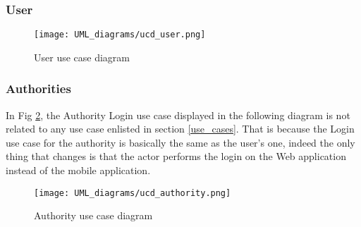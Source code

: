 \subsubsection{User}
\begin{figure}[H]
  \centering
  \texttt{[image: UML\_diagrams/ucd\_user.png]}
  \caption{User use case diagram}
  \label{fig:user_ucd}
\end{figure}

\subsubsection{Authorities}
In Fig \ref{fig:authority_ucd}, the Authority Login use case displayed in the following diagram is not related to any use case enlisted in section \ref{use_cases}. That is because the Login use case for the authority is basically the same as the user's one, indeed the only thing that changes is that the actor performs the login on the Web application instead of the mobile application.

\begin{figure}[H]
  \centering
  \texttt{[image: UML\_diagrams/ucd\_authority.png]}
  \caption{Authority use case diagram}
  \label{fig:authority_ucd}
\end{figure}
\newpage